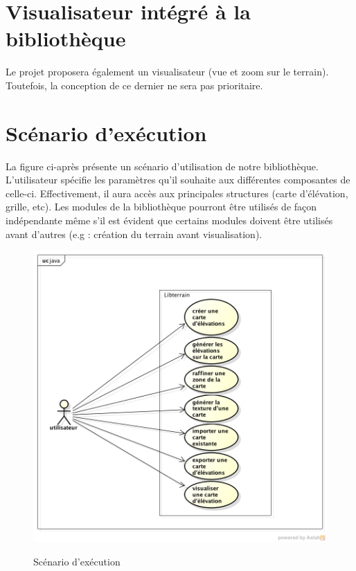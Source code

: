 \section*{Visualisateur intégré à la bibliothèque}

Le projet proposera également un visualisateur (vue et zoom sur le terrain). Toutefois, la conception de ce dernier ne sera pas prioritaire.

\section*{Scénario d'exécution}
La figure ci-après présente un scénario d'utilisation de notre
bibliothèque.
L'utilisateur spécifie les paramètres qu'il souhaite aux différentes composantes de
celle-ci. Effectivement, il aura accès aux principales structures (carte d'élévation,
grille, etc).
Les modules de la bibliothèque pourront être utilisés de façon indépendante même s'il
est évident que certains modules doivent être utilisés avant d'autres (e.g : création du terrain avant visualisation).


\begin{figure}[!ht]
    \begin{center}
        \includegraphics[width=15cm]{resources/use-case.png}
        \label{fig:use_case}
        \caption{Scénario d'exécution}
    \end{center}
\end{figure}


\thispagestyle{empty}
